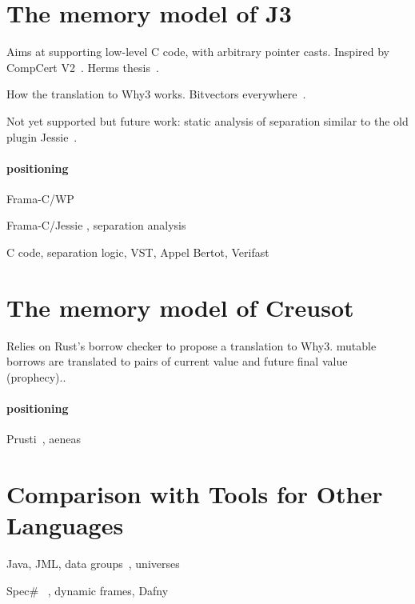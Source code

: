 \documentclass[a4paper,11pt]{article}
\begin{document}
\section{The memory model of J3}
\label{sec:j3}

Aims at supporting low-level C code, with arbitrary pointer casts. Inspired by
CompCert V2~\cite{leroy12rr}. Herms thesis~\cite{herms13phd}.

How the translation to Why3 works. Bitvectors everywhere~\cite{fumex16nfm}.

Not yet supported but future work: static analysis
of separation similar to the old plugin
Jessie~\cite{hubert2008these,hubert07hav}.


\paragraph{positioning}

Frama-C/WP~\cite{blanchard2024wp}

Frama-C/Jessie , separation analysis~\cite{hubert2008these,hubert07hav}

C code, separation logic, VST, Appel Bertot, Verifast


\section{The memory model of Creusot}
\label{sec:creusot}


Relies on Rust's borrow checker to propose a translation to Why3. mutable
borrows are translated to pairs of current value and future final value
(prophecy).\cite{denis23phd,denis22icfem,matsushita22pldi}.

\paragraph{positioning}

Prusti~\cite{astrauskas19oopsla}, aeneas~\cite{ho22icfp}


\section{Comparison with Tools for Other Languages}
\label{sec:related}

Java, JML, data groups~\cite{breunesse03ftfjp}, universes~\cite{Dietl05jot}

Spec\# ~\cite{BarnettLS04}, dynamic frames, Dafny
\end{document}
